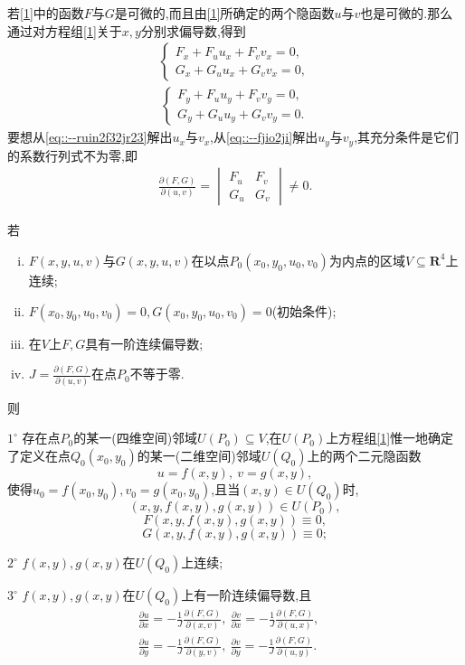 \documentclass[../../main.tex]{subfiles}%
\begin{document}
\begin{remark}
若\eqref{1}中的函数$F$与$G$是可微的,而且由\eqref{1}所确定的两个隐函数$u$与$v$也是可微的.那么通过对方程组\eqref{1}关于$x,y$分别求偏导数,得到
\begin{align}
\begin{cases} 
F_x + F_u u_x + F_v v_x = 0, \\
G_x + G_u u_x + G_v v_x = 0, 
\end{cases} \label{eq::--ruin2f32jr23}
\end{align}
\begin{align}
\begin{cases} 
F_y + F_u u_y + F_v v_y = 0, \\
G_y + G_u u_y + G_v v_y = 0. 
\end{cases} \label{eq::--fjio2ji}
\end{align}
要想从\eqref{eq::--ruin2f32jr23}解出$u_x$与$v_x$,从\eqref{eq::--fjio2ji}解出$u_y$与$v_y$,其充分条件是它们的系数行列式不为零,即
\begin{align*}
\frac{\partial(F,G)}{\partial(u,v)}=\begin{vmatrix} 
F_u & F_v \\
G_u & G_v 
\end{vmatrix} \neq 0.
\end{align*}
\end{remark}


\begin{theorem}
若
\begin{enumerate}[(i)]
\item $F(x,y,u,v)$与$G(x,y,u,v)$在以点$P_0(x_0,y_0,u_0,v_0)$为内点的区域$V \subseteq \mathbf{R}^4$上连续;
\item $F(x_0,y_0,u_0,v_0) = 0, G(x_0,y_0,u_0,v_0) = 0$(初始条件);
\item 在$V$上$F,G$具有一阶连续偏导数;
\item $J = \frac{\partial(F,G)}{\partial(u,v)}$在点$P_0$不等于零.
\end{enumerate}
则

$1^\circ$ 存在点$P_0$的某一(四维空间)邻域$U(P_0) \subseteq V$,在$U(P_0)$上方程组\eqref{1}惟一地确定了定义在点$Q_0(x_0,y_0)$的某一(二维空间)邻域$U(Q_0)$上的两个二元隐函数
\[
u = f(x,y),\ v = g(x,y),
\]
使得$u_0 = f(x_0,y_0), v_0 = g(x_0,y_0)$,且当$(x,y) \in U(Q_0)$时,
\[
(x,y,f(x,y),g(x,y)) \in U(P_0),
\]
\[
F(x,y,f(x,y),g(x,y)) \equiv 0,
\]
\[
G(x,y,f(x,y),g(x,y)) \equiv 0;
\]

$2^\circ$ $f(x,y),g(x,y)$在$U(Q_0)$上连续;

$3^\circ$ $f(x,y),g(x,y)$在$U(Q_0)$上有一阶连续偏导数,且
\begin{align}
\frac{\partial u}{\partial x} = -\frac{1}{J}\frac{\partial(F,G)}{\partial(x,v)},\ \frac{\partial v}{\partial x} = -\frac{1}{J}\frac{\partial(F,G)}{\partial(u,x)},\quad \label{5} \\
\frac{\partial u}{\partial y} = -\frac{1}{J}\frac{\partial(F,G)}{\partial(y,v)},\ \frac{\partial v}{\partial y} = -\frac{1}{J}\frac{\partial(F,G)}{\partial(u,y)}. \nonumber
\end{align}
\end{theorem}
\end{document}
